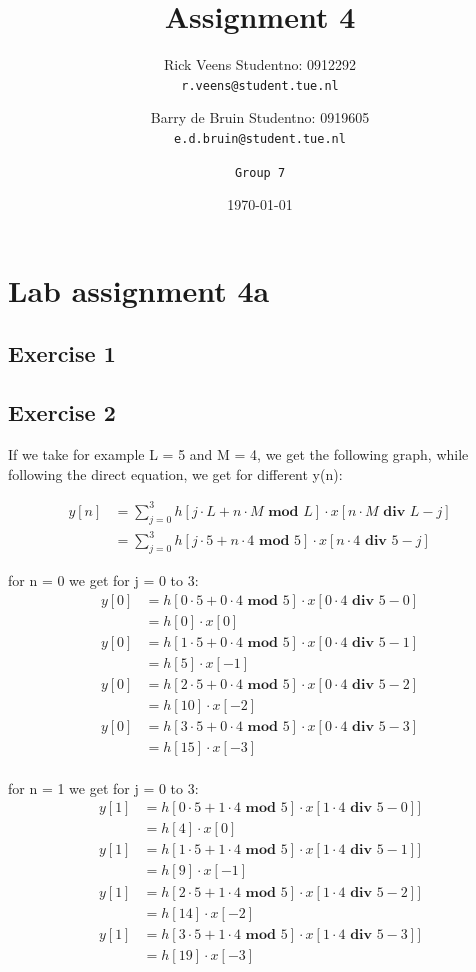 \documentclass[a4paper,twoside,11pt, fleqn]{article}
\title{\vspace{-\baselineskip}\sffamily\bfseries Assignment 4}
\author{
	Rick Veens \qquad Studentno: 0912292\\
	\texttt{r.veens@student.tue.nl}
	\and
	Barry de Bruin \qquad Studentno: 0919605\\
	\texttt{e.d.bruin@student.tue.nl}
	\and
	\texttt{Group 7}
}
\date{\today}
\begin{document}
\maketitle
\newpage

\section{Lab assignment 4a}

\subsection{Exercise 1}
\subsection{Exercise 2}
If we take for example L = 5 and M = 4, we get the following graph, while following the direct equation, we get for different y(n):

\begin{align}
y[n] &= \sum_{j=0}^3 h[j\cdot L + n\cdot M \textbf{ mod } L]\cdot x[n\cdot M \textbf{ div } L - j]\\
&= \sum_{j=0}^3 h[j\cdot 5 + n\cdot 4 \textbf{ mod } 5]\cdot x[n\cdot 4 \textbf{ div } 5 - j]
\end{align}


for n = 0 we get for j = 0 to 3:
\begin{align}
y[0] &= h[0\cdot 5 + 0\cdot 4 \textbf{ mod } 5]\cdot x[0\cdot 4 \textbf{ div } 5 - 0]\\ 
&= h[0]\cdot x[0] \\
y[0] &= h[1\cdot 5 + 0\cdot 4 \textbf{ mod } 5]\cdot x[0\cdot 4 \textbf{ div } 5 - 1] \\
&= h[5]\cdot x[-1] \\
y[0] &= h[2\cdot 5 + 0\cdot 4 \textbf{ mod } 5]\cdot x[0\cdot 4 \textbf{ div } 5 - 2] \\
&= h[10]\cdot x[-2] \\
y[0] &= h[3\cdot 5 + 0\cdot 4 \textbf{ mod } 5]\cdot x[0\cdot 4 \textbf{ div } 5 - 3] \\
&= h[15]\cdot x[-3] \\
\end{align}

for n = 1 we get for j = 0 to 3:
\begin{align}
y[1] &= h[0\cdot 5 + 1\cdot 4 \textbf{ mod } 5]\cdot x[1\cdot 4 \textbf{ div } 5 - 0]]\\ 
&= h[4]\cdot x[0] \\
y[1] &= h[1\cdot 5 + 1\cdot 4 \textbf{ mod } 5]\cdot x[1\cdot 4 \textbf{ div } 5 - 1]] \\
&= h[9]\cdot x[-1] \\
y[1] &= h[2\cdot 5 + 1\cdot 4 \textbf{ mod } 5]\cdot x[1\cdot 4 \textbf{ div } 5 - 2]] \\
&= h[14]\cdot x[-2] \\
y[1] &= h[3\cdot 5 + 1\cdot 4 \textbf{ mod } 5]\cdot x[1\cdot 4 \textbf{ div } 5 - 3]] \\
&= h[19]\cdot x[-3] \\
\end{align}
\end{document}

